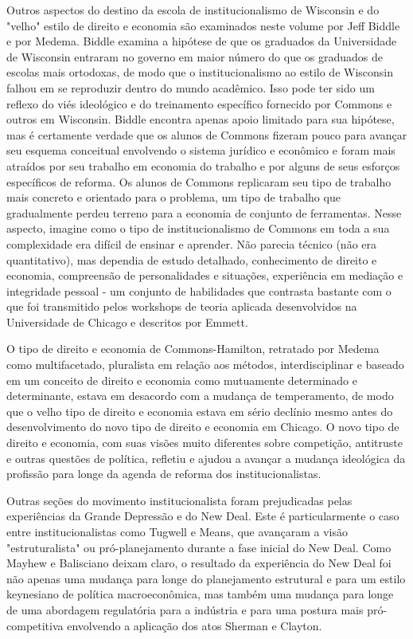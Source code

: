 \documentclass[a4paper,12pt]{article}[abntex2]
\begin{document}
Outros aspectos do destino da escola de institucionalismo de Wisconsin e do "velho" estilo de direito e economia são examinados neste volume por Jeff Biddle e por Medema. Biddle examina a hipótese de que os graduados da Universidade de Wisconsin entraram no governo em maior número do que os graduados de escolas mais ortodoxas, de modo que o institucionalismo ao estilo de Wisconsin falhou em se reproduzir dentro do mundo acadêmico. Isso pode ter sido um reflexo do viés ideológico e do treinamento específico fornecido por Commons e outros em Wisconsin. Biddle encontra apenas apoio limitado para sua hipótese, mas é certamente verdade que os alunos de Commons fizeram pouco para avançar seu esquema conceitual envolvendo o sistema jurídico e econômico e foram mais atraídos por seu trabalho em economia do trabalho e por alguns de seus esforços específicos de reforma. Os alunos de Commons replicaram seu tipo de trabalho mais concreto e orientado para o problema, um tipo de trabalho que gradualmente perdeu terreno para a economia de conjunto de ferramentas. Nesse aspecto, imagine como o tipo de institucionalismo de Commons em toda a sua complexidade era difícil de ensinar e aprender. Não parecia técnico (não era quantitativo), mas dependia de estudo detalhado, conhecimento de direito e economia, compreensão de personalidades e situações, experiência em mediação e integridade pessoal - um conjunto de habilidades que contrasta bastante com o que foi transmitido pelos workshops de teoria aplicada desenvolvidos na Universidade de Chicago e descritos por Emmett.

O tipo de direito e economia de Commons-Hamilton, retratado por Medema como multifacetado, pluralista em relação aos métodos, interdisciplinar e baseado em um conceito de direito e economia como mutuamente determinado e determinante, estava em desacordo com a mudança de temperamento, de modo que o velho tipo de direito e economia estava em sério declínio mesmo antes do desenvolvimento do novo tipo de direito e economia em Chicago. O novo tipo de direito e economia, com suas visões muito diferentes sobre competição, antitruste e outras questões de política, refletiu e ajudou a avançar a mudança ideológica da profissão para longe da agenda de reforma dos institucionalistas.

Outras seções do movimento institucionalista foram prejudicadas pelas experiências da Grande Depressão e do New Deal. Este é particularmente o caso entre institucionalistas como Tugwell e Means, que avançaram a visão "estruturalista" ou pró-planejamento durante a fase inicial do New Deal. Como Mayhew e Balisciano deixam claro, o resultado da experiência do New Deal foi não apenas uma mudança para longe do planejamento estrutural e para um estilo keynesiano de política macroeconômica, mas também uma mudança para longe de uma abordagem regulatória para a indústria e para uma postura mais pró-competitiva envolvendo a aplicação dos atos Sherman e Clayton.
\end{document}
